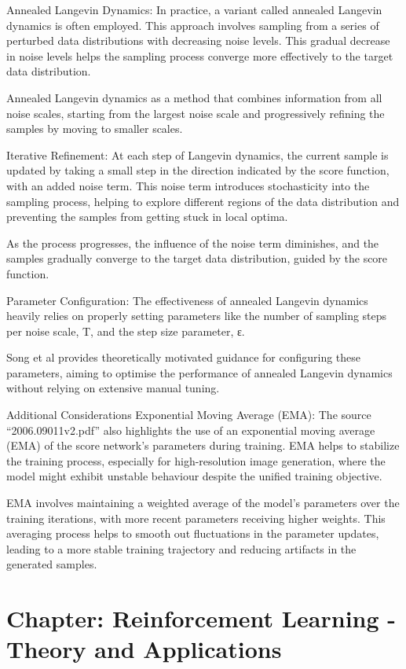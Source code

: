 \documentclass[
]{book}
\begin{document}
Annealed Langevin Dynamics: In practice, a variant called annealed Langevin dynamics is often employed. This approach involves sampling from a series of perturbed data distributions with decreasing noise levels. This gradual decrease in noise levels helps the sampling process converge more effectively to the target data distribution.

Annealed Langevin dynamics as a method that combines information from all noise scales, starting from the largest noise scale and progressively refining the samples by moving to smaller scales.

Iterative Refinement: At each step of Langevin dynamics, the current sample is updated by taking a small step in the direction indicated by the score function, with an added noise term. This noise term introduces stochasticity into the sampling process, helping to explore different regions of the data distribution and preventing the samples from getting stuck in local optima.

As the process progresses, the influence of the noise term diminishes, and the samples gradually converge to the target data distribution, guided by the score function.

Parameter Configuration: The effectiveness of annealed Langevin dynamics heavily relies on properly setting parameters like the number of sampling steps per noise scale, T, and the step size parameter, ε.

Song et al provides theoretically motivated guidance for configuring these parameters, aiming to optimise the performance of annealed Langevin dynamics without relying on extensive manual tuning.

Additional Considerations
Exponential Moving Average (EMA): The source ``2006.09011v2.pdf'' also highlights the use of an exponential moving average (EMA) of the score network's parameters during training. EMA helps to stabilize the training process, especially for high-resolution image generation, where the model might exhibit unstable behaviour despite the unified training objective.

EMA involves maintaining a weighted average of the model's parameters over the training iterations, with more recent parameters receiving higher weights. This averaging process helps to smooth out fluctuations in the parameter updates, leading to a more stable training trajectory and reducing artifacts in the generated samples.

\chapter{\texorpdfstring{\textbf{Chapter: Reinforcement Learning - Theory and Applications}}{Chapter: Reinforcement Learning - Theory and Applications}}\label{chapter-reinforcement-learning---theory-and-applications}
\end{document}
